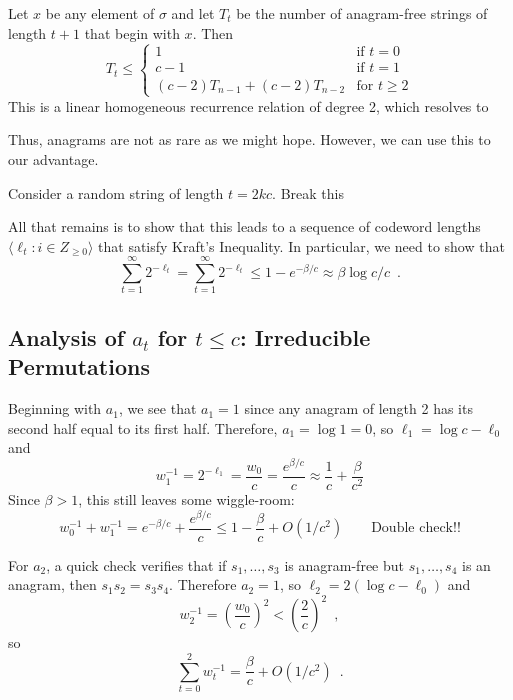 \documentclass{patmorin}
\begin{document}
Let $x$ be any element of $\sigma$ and let $T_t$ be the number of anagram-free strings of length $t+1$ that begin with $x$.  Then
\[
   T_t \le \begin{cases}
         1 & \text{if $t=0$} \\
         c-1 & \text{if $t=1$} \\
         (c-2)T_{n-1} + (c-2)T_{n-2} & \text{for $t\ge 2$}
       \end{cases}
\]
This is a linear homogeneous recurrence relation of degree 2, which resolves to 



Thus, anagrams are not as rare as we might hope.  However, we can use this to our advantage.

Consider a random string of length $t=2kc$.  Break this 















All that remains is to show that this leads to a sequence of codeword lengths $\langle \ell_t : i\in Z_{\ge 0}\rangle$ that satisfy Kraft's Inequality.  In particular, we need to show that
\[
  \sum_{t=1}^\infty 2^{-\ell_t} = \sum_{t=1}^\infty 2^{-\ell_t} \le 1-e^{-\beta/c} \approx \beta\log c/c \enspace .
\]

\subsection{Analysis of $a_t$ for $t\le c$: Irreducible Permutations}

Beginning with $a_1$, we see that $a_1=1$ since any anagram of length 2 has its second half equal to its first half.  Therefore, $a_1=\log 1 = 0$, so $\ell_1=\log c - \ell_0$ and 
\[
   w_1^{-1} = 2^{-\ell_1} = \frac{w_0}{c} = \frac{e^{\beta/c}}{c} \approx \frac{1}{c}+\frac{\beta}{c^2}
\]
Since $\beta >1$, this still leaves some wiggle-room:
\[
    w_0^{-1} + w_1^{-1} = e^{-\beta/c} + \frac{e^{\beta/c}}{c}
    \le 1 - \frac{\beta}{c} + O(1/c^2)  \qquad \text{Double check!!}
\]

For $a_2$, a quick check verifies that if $s_1,\ldots,s_3$ is anagram-free but $s_1,\ldots,s_4$ is an anagram, then $s_1s_2=s_3s_4$.  Therefore $a_2=1$, so
$\ell_2 = 2(\log c - \ell_0)$ and
\[
   w_2^{-1} = \left(\frac{w_0}{c}\right)^2 < \left(\frac{2}{c}\right)^2 \enspace , 
\]
so 
\[
  \sum_{t=0}^2 w_t^{-1} = \frac{\beta}{c} + O(1/c^2) \enspace .
\]
\end{document}

